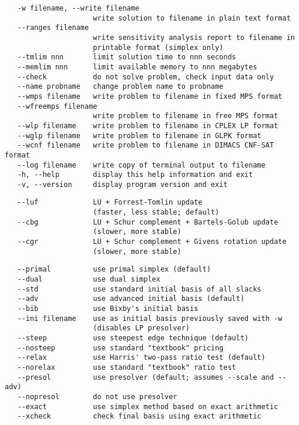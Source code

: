 \begin{verbatim}
   -w filename, --write filename
                     write solution to filename in plain text format
   --ranges filename
                     write sensitivity analysis report to filename in
                     printable format (simplex only)
   --tmlim nnn       limit solution time to nnn seconds
   --memlim nnn      limit available memory to nnn megabytes
   --check           do not solve problem, check input data only
   --name probname   change problem name to probname
   --wmps filename   write problem to filename in fixed MPS format
   --wfreemps filename
                     write problem to filename in free MPS format
   --wlp filename    write problem to filename in CPLEX LP format
   --wglp filename   write problem to filename in GLPK format
   --wcnf filename   write problem to filename in DIMACS CNF-SAT format
   --log filename    write copy of terminal output to filename
   -h, --help        display this help information and exit
   -v, --version     display program version and exit
\end{verbatim}


\begin{verbatim}
   --luf             LU + Forrest-Tomlin update
                     (faster, less stable; default)
   --cbg             LU + Schur complement + Bartels-Golub update
                     (slower, more stable)
   --cgr             LU + Schur complement + Givens rotation update
                     (slower, more stable)
\end{verbatim}


\begin{verbatim}
   --primal          use primal simplex (default)
   --dual            use dual simplex
   --std             use standard initial basis of all slacks
   --adv             use advanced initial basis (default)
   --bib             use Bixby's initial basis
   --ini filename    use as initial basis previously saved with -w
                     (disables LP presolver)
   --steep           use steepest edge technique (default)
   --nosteep         use standard "textbook" pricing
   --relax           use Harris' two-pass ratio test (default)
   --norelax         use standard "textbook" ratio test
   --presol          use presolver (default; assumes --scale and --adv)
   --nopresol        do not use presolver
   --exact           use simplex method based on exact arithmetic
   --xcheck          check final basis using exact arithmetic
\end{verbatim}

